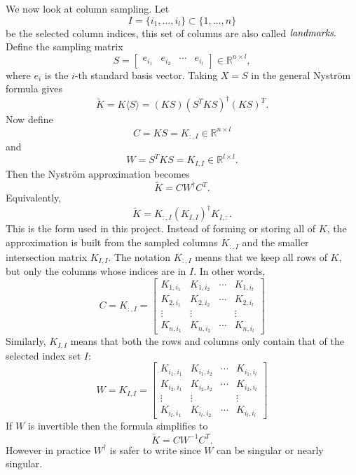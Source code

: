 We now look at column sampling. Let
\[
I=\{i_1,\ldots,i_l\}\subset\{1,\ldots,n\}
\]
be the selected column indices, this set of columns are also called $\emph{landmarks}.$ Define the sampling matrix
\[
S=\begin{bmatrix}e_{i_1}&e_{i_2}&\cdots&e_{i_l}\end{bmatrix}\in\mathbb{R}^{n\times l},
\]
where $e_i$ is the $i$-th standard basis vector. Taking $X=S$ in the general Nystr\"om formula gives
\[
\tilde K=K\langle S\rangle=(KS)(S^TKS)^\dagger(KS)^T.
\]
Now define
\[
C=KS=K_{:,I}\in\mathbb{R}^{n\times l}
\]
and
\[
W=S^TKS=K_{I,I}\in\mathbb{R}^{l\times l}.
\]
Then the Nystr\"om approximation becomes
\[
\tilde K=CW^\dagger C^T.
\]
Equivalently,
\[
\tilde K=K_{:,I}(K_{I,I})^\dagger K_{I,:}.
\]
This is the form used in this project. Instead of forming or storing all of $K$, the approximation is built from the sampled columns $K_{:,I}$ and the smaller intersection matrix $K_{I,I}$. The notation $K_{:,I}$ means that we keep all rows of $K$, but only the columns whose indices are in $I$. In other words,
\[
C=K_{:,I}=
\begin{bmatrix}
K_{1,i_1} & K_{1,i_2} & \cdots & K_{1,i_l}\\
K_{2,i_1} & K_{2,i_2} & \cdots & K_{2,i_l}\\
\vdots & \vdots & & \vdots\\
K_{n,i_1} & K_{n,i_2} & \cdots & K_{n,i_l}
\end{bmatrix}
\]
Similarly, $K_{I,I}$ means that both the rows and columns only contain that of the selected index set $I$:
\[
W=K_{I,I}=
\begin{bmatrix}
K_{i_1,i_1} & K_{i_1,i_2} & \cdots & K_{i_1,i_l}\\
K_{i_2,i_1} & K_{i_2,i_2} & \cdots & K_{i_2,i_l}\\
\vdots & \vdots & & \vdots\\
K_{i_l,i_1} & K_{i_l,i_2} & \cdots & K_{i_l,i_l}
\end{bmatrix}
\]
If $W$ is invertible then the formula simplifies to
\[
\tilde K=CW^{-1}C^T.
\]
However in practice $W^\dagger$ is safer to write since $W$ can be singular or nearly singular.


